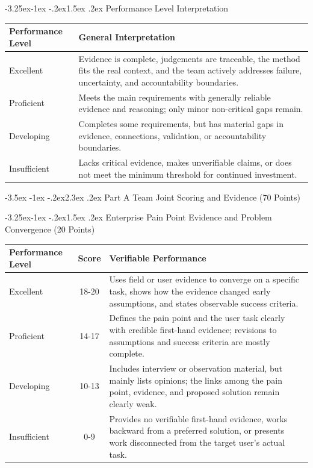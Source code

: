 \documentclass[11pt]{article}
\makeatletter
\renewcommand\section{\@startsection{section}{1}{\z@}%
    {-3.5ex \@plus -1ex \@minus -.2ex}{2.3ex \@plus.2ex}%
    {\normalfont\Large\sffamily\bfseries}}
\renewcommand\subsection{\@startsection{subsection}{2}{\z@}%
    {-3.25ex\@plus -1ex \@minus -.2ex}{1.5ex \@plus .2ex}%
    {\normalfont\large\sffamily\bfseries}}
\newcommand{\formaltable}{%
  \small
  \setlength{\tabcolsep}{5pt}%
  \renewcommand{\arraystretch}{1.2}%
  \setlength{\arrayrulewidth}{0.4pt}%
}
\renewcommand{\arraystretch}{1.2}
\makeatother
\begin{document}
\subsection{Performance Level Interpretation}
\begin{center}
\formaltable
\begin{tabularx}{\textwidth}{|l|Y|}
\hline
\textbf{Performance Level} & \textbf{General Interpretation} \\ \hline
Excellent & Evidence is complete, judgements are traceable, the method fits the real context, and the team actively addresses failure, uncertainty, and accountability boundaries. \\ \hline
Proficient & Meets the main requirements with generally reliable evidence and reasoning; only minor non-critical gaps remain. \\ \hline
Developing & Completes some requirements, but has material gaps in evidence, connections, validation, or accountability boundaries. \\ \hline
Insufficient & Lacks critical evidence, makes unverifiable claims, or does not meet the minimum threshold for continued investment. \\ \hline
\end{tabularx}
\end{center}

\section{Part A Team Joint Scoring and Evidence (70 Points)}

\subsection{Enterprise Pain Point Evidence and Problem Convergence (20 Points)}
\begin{center}
\formaltable
\begin{tabularx}{\textwidth}{|l|c|Y|}
\hline
\textbf{Performance Level} & \textbf{Score} & \textbf{Verifiable Performance} \\ \hline
Excellent & 18-20 & Uses field or user evidence to converge on a specific task, shows how the evidence changed early assumptions, and states observable success criteria. \\ \hline
Proficient & 14-17 & Defines the pain point and the user task clearly with credible first-hand evidence; revisions to assumptions and success criteria are mostly complete. \\ \hline
Developing & 10-13 & Includes interview or observation material, but mainly lists opinions; the links among the pain point, evidence, and proposed solution remain clearly weak. \\ \hline
Insufficient & 0-9 & Provides no verifiable first-hand evidence, works backward from a preferred solution, or presents work disconnected from the target user's actual task. \\ \hline
\end{tabularx}
\end{center}
\end{document}
